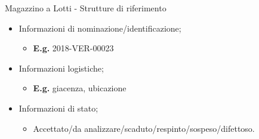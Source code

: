 \documentclass{beamer}
\begin{document}
\begin{frame}{Magazzino a Lotti - Strutture di riferimento}
    \begin{itemize}
        \item Informazioni di nominazione/identificazione;
        \begin{itemize}
            \item \textbf{E.g.} 2018-VER-00023
        \end{itemize}
        \item Informazioni logistiche;
        \begin{itemize}
            \item \textbf{E.g.} giacenza, ubicazione
        \end{itemize}
        \item Informazioni di stato;
        \begin{itemize}
            \item Accettato/da analizzare/scaduto/respinto/sospeso/difettoso.
        \end{itemize}
    \end{itemize}
\end{frame}
\end{document}
